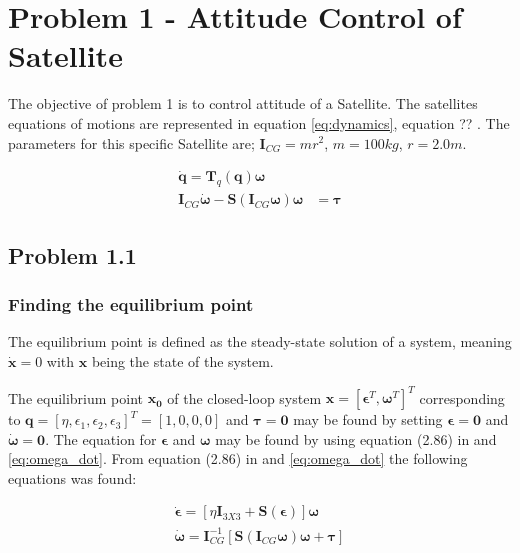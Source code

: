 \section*{Problem 1 - Attitude Control of Satellite}

The objective of problem 1 is to control attitude of a Satellite. The satellites equations of motions are represented in equation \eqref{eq:dynamics}, equation ??  \cite{Fossen2011}. The parameters for this specific Satellite are; $\mathbf{I}_{CG} = mr^2$, $m = 100 kg$, $r = 2.0 m$. 

\begin{subequations}
\label{eq:dynamics}
	\begin{align}
		\dot{\mathbf{q}} = \mathbf{T}_q (\mathbf{q} ) \boldsymbol{\omega} \\
		\mathbf{I}_{CG} \dot{\boldsymbol{\omega}} - \mathbf{S} (\mathbf{I}_{CG} \boldsymbol{\omega} ) \boldsymbol{\omega} & =  \boldsymbol{\tau} \label{eq:omega_dot}
	\end{align}	
\end{subequations}



\subsection*{Problem 1.1}

\subsubsection*{Finding the equilibrium point}

The equilibrium point is defined as the steady-state solution of a system, meaning $\dot{\mathbf{x}} = 0$ with $\mathbf{x}$ being the state of the system.


The equilibrium point $\mathbf{x_0}$ of the closed-loop system $\mathbf{x} = [ \boldsymbol{\epsilon}^T, \boldsymbol{\omega}^T]^T$ corresponding to $\mathbf{q} = [\eta,\epsilon_1, \epsilon_2, \epsilon_3]^T = [1, 0, 0, 0]$ and $\boldsymbol{\tau} = \boldsymbol{0}$ may be found by setting $\boldsymbol{\epsilon} = \mathbf{0}$ and $\dot{\boldsymbol{\omega}} = \mathbf{0}$. The equation for $\boldsymbol{\epsilon}$ and $\boldsymbol{\omega}$ may be found by using equation (2.86) in \cite{Fossen2011} and \eqref{eq:omega_dot}. From equation (2.86) in \cite{Fossen2011} and \eqref{eq:omega_dot} the following equations was found:


\begin{subequations}
\label{eq:x_dot}
	\begin{align}
		\dot{\boldsymbol{\epsilon}} =  [ \eta \mathbf{I}_{3X3} + \mathbf{S}(\boldsymbol{\epsilon}) ] \boldsymbol{\omega} \\
		 \dot{\boldsymbol{\omega}} = \mathbf{I}_{CG}^{-1} [\mathbf{S} (\mathbf{I}_{CG} \boldsymbol{\omega} ) \boldsymbol{\omega} +  \boldsymbol{\tau} ]
	\end{align}	
\end{subequations}


